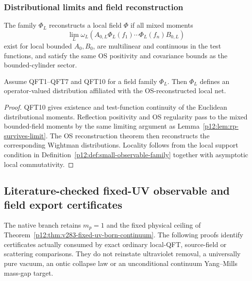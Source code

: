 \documentclass[12pt,a4paper]{article}
\begin{document}
\subsubsection{Distributional limits and field reconstruction}
\label{p12:sec:distributional-limits-field-reconstruction}

\begin{definition}
\label{p12:def:distributional-field-limit}
The family \(\Phi_L\) reconstructs a local field \(\Phi\) if all mixed moments
\begin{equation}
\label{p12:eq:mixed-field-moments}
\lim_{L}\omega_L\left(A_{0,L}\Phi_L(f_1)\cdots\Phi_L(f_n)B_{0,L}\right)
\end{equation}
exist for local bounded \(A_0,B_0\), are multilinear and continuous in the test functions, and satisfy the same OS positivity and covariance bounds as the bounded-cylinder sector.
\end{definition}

\begin{theorem}
\label{p12:thm:small-observable-field-reconstruction}
Assume QFT1--QFT7 and QFT10 for a field family \(\Phi_L\).  Then \(\Phi_L\) defines an operator-valued distribution affiliated with the OS-reconstructed local net.
\end{theorem}
\begin{proof}
QFT10 gives existence and test-function continuity of the Euclidean distributional moments.  Reflection positivity and OS regularity pass to the mixed bounded-field moments by the same limiting argument as Lemma~\ref{p12:lem:rp-survives-limit}.  The OS reconstruction theorem then reconstructs the corresponding Wightman distributions.  Locality follows from the local support condition in Definition~\ref{p12:def:small-observable-family} together with asymptotic local commutativity.
\end{proof}


\subsection{Literature-checked fixed-UV observable and field export certificates}
\label{p12:sec:v2210-lit-export-certificates}
The native branch retains $m_p=1$ and the fixed physical ceiling of
Theorem~\ref{p12:thm:v283-fixed-uv-born-continuum}. The following proofs
identify certificates actually consumed by exact ordinary local-QFT,
source-field or scattering comparisons. They do not reinstate ultraviolet
removal, a universally pure vacuum, an ontic collapse law or an unconditional
continuum Yang--Mills mass-gap target.
\end{document}
